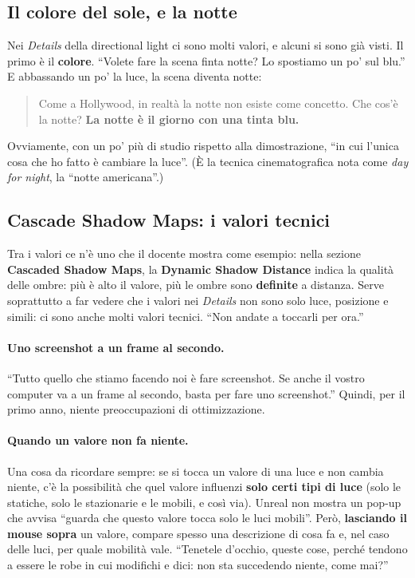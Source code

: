 \subsection{Il colore del sole, e la notte}

Nei \emph{Details} della directional light ci sono molti valori, e alcuni si sono
già visti. Il primo è il \textbf{colore}. ``Volete fare la scena finta notte? Lo
spostiamo un po' sul blu.'' E abbassando un po' la luce, la scena diventa notte:
\begin{quote}
Come a Hollywood, in realtà la notte non esiste come concetto. Che cos'è la notte?
\textbf{La notte è il giorno con una tinta blu.}
\end{quote}
Ovviamente, con un po' più di studio rispetto alla dimostrazione, ``in cui l'unica
cosa che ho fatto è cambiare la luce''. (È la tecnica cinematografica nota come
\emph{day for night}, la ``notte americana''.)

\subsection{Cascade Shadow Maps: i valori tecnici}

Tra i valori ce n'è uno che il docente mostra come esempio: nella sezione
\textbf{Cascaded Shadow Maps}, la \textbf{Dynamic Shadow Distance} indica la qualità
delle ombre: più è alto il valore, più le ombre sono \textbf{definite} a distanza.
Serve soprattutto a far vedere che i valori nei \emph{Details} non sono solo luce,
posizione e simili: ci sono anche molti valori tecnici. ``Non andate a toccarli
per ora.''

\paragraph{Uno screenshot a un frame al secondo.} ``Tutto quello che stiamo facendo
noi è fare screenshot. Se anche il vostro computer va a un frame al secondo, basta
per fare uno screenshot.'' Quindi, per il primo anno, niente preoccupazioni di
ottimizzazione.

\paragraph{Quando un valore non fa niente.} Una cosa da ricordare sempre: se si
tocca un valore di una luce e non cambia niente, c'è la possibilità che quel valore
influenzi \textbf{solo certi tipi di luce} (solo le statiche, solo le stazionarie e
le mobili, e così via). Unreal non mostra un pop-up che avvisa ``guarda che questo
valore tocca solo le luci mobili''. Però, \textbf{lasciando il mouse sopra} un
valore, compare spesso una descrizione di cosa fa e, nel caso delle luci, per
quale mobilità vale. ``Tenetele d'occhio, queste cose, perché tendono a essere le
robe in cui modifichi e dici: non sta succedendo niente, come mai?''

